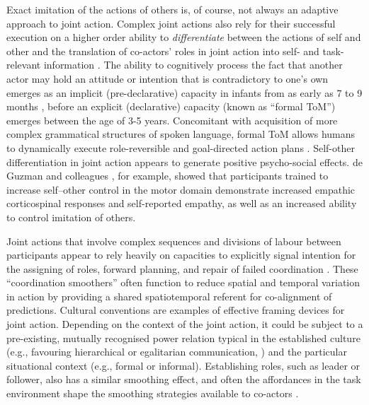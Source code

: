 Exact imitation of the actions of others is, of course, not always an adaptive approach to joint action.  Complex joint actions also rely for their successful execution on a higher order ability to \textit{differentiate} between the actions of self and other and the translation of co-actors' roles in joint action into self- and task-relevant information \citep{Novembre2012,Sowden2014,Milward2016}.
The ability to cognitively process the fact that another actor may hold an attitude or intention that is contradictory to one's own emerges as an implicit (pre-declarative) capacity in infants from as early as 7 to 9 months \citep{Baron-Cohen1991}, before an explicit (declarative) capacity (known as ``formal ToM'') emerges between the age of 3-5 years. Concomitant with acquisition of more complex grammatical structures of spoken language, formal ToM allows humans to dynamically execute role-reversible and goal-directed action plans \citep{Tomasello2005a,Tomasello2008,Tomasello2014}.
Self-other differentiation in joint action appears to generate positive psycho-social effects.  de Guzman and colleagues \textcite{DeGuzman2015}, for example, showed that participants trained to increase self–other control in the motor domain demonstrate increased empathic corticospinal responses and self-reported empathy, as well as an increased ability to control imitation of others.

Joint actions that involve complex sequences and divisions of labour between participants appear to rely heavily on capacities to explicitly signal intention for the assigning of roles, forward planning, and repair of failed coordination \citep{Frith2010}. These ``coordination smoothers'' \citep{Vesper2017} often function to reduce spatial and temporal variation in action by providing a shared spatiotemporal referent for co-alignment of predictions.  Cultural conventions are examples of effective framing devices for joint action.  Depending on the context of the joint action, it could be subject to a pre-existing, mutually recognised power relation typical in the established culture (e.g., favouring hierarchical or egalitarian communication, \citep[see]{Cheon2011}) and the particular situational context (e.g., formal or informal).
Establishing roles, such as leader or follower, also has a similar smoothing effect, and often the affordances in the task environment shape the smoothing strategies available to co-actors \citep{Marsh2009}.

